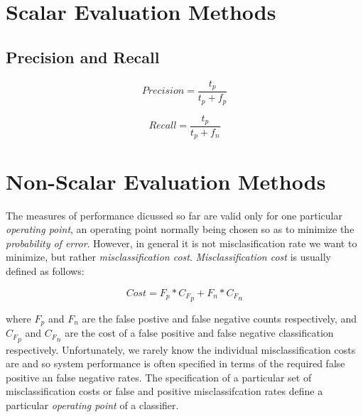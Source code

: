 \documentclass[10pt]{unbthesis}
\begin{document}
\section*{Scalar Evaluation Methods}


\subsection*{Precision and Recall}

\begin{equation}
\label{equ:precision}
Precision = \frac{t_p}{t_p + f_p}
\end{equation}


\begin{equation}
\label{equ:recall}
Recall = \frac{t_p}{t_p + f_n}
\end{equation}

\section*{Non-Scalar Evaluation Methods}
The measures of performance dicussed so far are valid only for one
particular \textit{operating point}, an operating point normally being
chosen so as to minimize the \textit{probability of error}. However,
in general it is not misclasification rate we want to minimize, but
rather \textit{misclassification cost}. \textit{Misclassification
  cost} is usually defined as follows:

\begin{equation}
\label{equ:misclasscost}
Cost = F_p * {C_F}_p + F_n * {C_F}_n
\end{equation}

where \(F_p\) and \(F_n\) are the false postive and false negative
counts respectively, and \({C_F}_p\) and \({C_F}_n\) are the cost of a
false positive and false negative classification respectively.
Unfortunately, we rarely know the individual misclassification costs
are and so system performance is often specified in terms of the
required false positive an false negative rates. The specification of
a particular set of misclassification costs or false and positive
misclassifcation rates define a particular \textit{operating point} of
a classifier.
\end{document}
